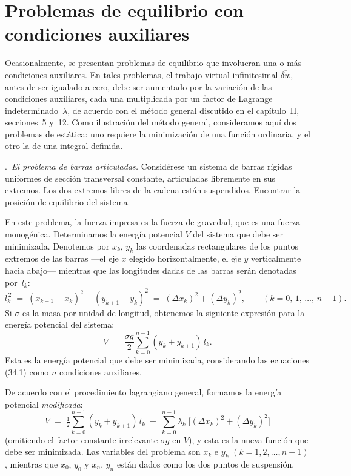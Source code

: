 \section{Problemas de equilibrio con condiciones auxiliares}

Ocasionalmente, se presentan problemas de equilibrio que involucran una o más condiciones auxiliares. En tales problemas, el trabajo virtual infinitesimal $\overline{\delta w}$, antes de ser igualado a cero, debe ser aumentado por la variación de las condiciones auxiliares, cada una multiplicada por un factor de Lagrange indeterminado~$\lambda$, de acuerdo con el método general discutido en el capítulo~II, secciones~5 y~12. Como ilustración del método general, consideramos aquí dos problemas de estática: uno requiere la minimización de una función ordinaria, y el otro la de una integral definida.

\medskip
{}.\ \textit{El problema de barras articuladas.} Considérese un sistema de barras rígidas uniformes de sección transversal constante, articuladas libremente en sus extremos. Los dos extremos libres de la cadena están suspendidos. Encontrar la posición de equilibrio del sistema.

En este problema, la fuerza impresa es la fuerza de gravedad, que es una fuerza monogénica. Determinamos la energía potencial $V$ del sistema que debe ser minimizada. Denotemos por $x_k$, $y_k$ las coordenadas rectangulares de los puntos extremos de las barras ---el eje $x$ elegido horizontalmente, el eje $y$ verticalmente hacia abajo--- mientras que las longitudes dadas de las barras serán denotadas por~$l_k$:
\begin{equation}
l_k^{\,2} \;=\; (x_{k+1} - x_k)^2 + (y_{k+1} - y_k)^2 \;=\; (\Delta x_k)^2 + (\Delta y_k)^2, \qquad (k = 0,\, 1,\, \ldots,\, n-1). \tag{34.1}
\end{equation}
Si $\sigma$ es la masa por unidad de longitud, obtenemos la siguiente expresión para la energía potencial del sistema:
\begin{equation}
V \;=\; \frac{\sigma g}{2} \sum_{k=0}^{n-1} (y_k + y_{k+1})\,l_k. \tag{34.2}
\end{equation}
Esta es la energía potencial que debe ser minimizada, considerando las ecuaciones (34.1) como $n$ condiciones auxiliares.

De acuerdo con el procedimiento lagrangiano general, formamos la energía potencial \emph{modificada}:
\begin{equation}
\overline{V} \;=\; \tfrac{1}{2} \sum_{k=0}^{n-1} (y_k + y_{k+1})\,l_k \;+\; \sum_{k=0}^{n-1} \lambda_k\;\bigl[(\Delta x_k)^2 + (\Delta y_k)^2\bigr] \tag{34.3}
\end{equation}
(omitiendo el factor constante irrelevante $\sigma g$ en $V$), y esta es la nueva función que debe ser minimizada. Las variables del problema son $x_k$ e $y_k$ $(k = 1, 2, \ldots, n-1)$, mientras que $x_0$, $y_0$ y $x_n$, $y_n$ están dados como los dos puntos de suspensión.

